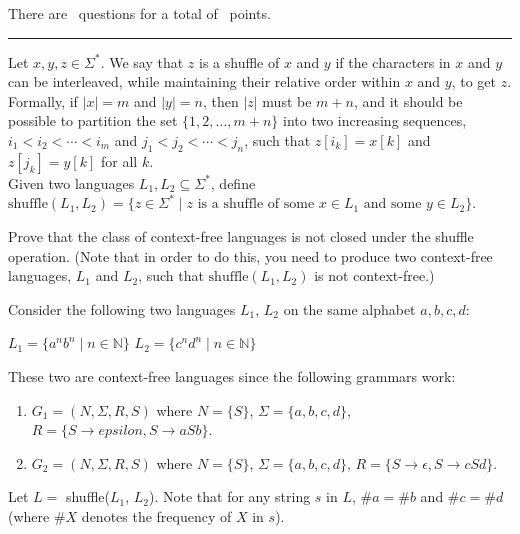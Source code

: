 \documentclass[answers]{exam}
\begin{document}
\vspace{0.1in}

\vspace{0.1in}
There are \numquestions\, questions for a total of \numpoints\, points.
\vspace{0.1in}
\hrule
\vspace{0.2in}
\begin{questions}

Let $x, y, z \in \Sigma^*$. We say that $z$ is a shuffle of $x$ and $y$ if the characters in $x$ and $y$ can be interleaved, while maintaining their relative order within $x$ and $y$, to get $z$.
Formally, if $|x| = m$ and $|y| = n$, then $|z|$ must be $m + n$, and it should be possible to partition the set $\{1, 2, \ldots, m + n\}$ into two increasing sequences, $i_1 < i_2 < \cdots < i_m$ and
$j_1 < j_2 < \cdots < j_n$, such that $z[i_k] = x[k]$ and $z[j_k] = y[k]$ for all $k$.\\

Given two languages $L_1, L_2 \subseteq \Sigma^*$, define $\mathrm{shuffle}(L_1, L_2) = \{z \in \Sigma^* \mid z \text{ is a shuffle of some } x \in L_1 \text{ and some } y \in L_2\}$.

\question[5]

Prove that the class of context-free languages is not closed under the shuffle operation. (Note that in order to do this, you need to produce two context-free languages, $L_1$ and $L_2$, such that
$\text{shuffle}(L_1,L_2)$ is not context-free.)

\begin{solution}

Consider the following two languages $L_1$, $L_2$ on the same alphabet ${a, b, c, d}$:

$L_1 = \{a^nb^n \mid n \in \mathbb{N}\}$
$L_2 = \{c^nd^n \mid n \in \mathbb{N}\}$

These two are context-free languages since the following grammars work:
\begin{enumerate}
    \item $G_1 = (N, \Sigma, R, S)$ where $N = \{S\}$, $\Sigma = \{a, b, c, d\}$, $R = \{S \to epsilon, S \to aSb\}$.
    \item $G_2 = (N, \Sigma, R, S)$ where $N = \{S\}$, $\Sigma = \{a, b, c, d\}$, $R = \{S \to \epsilon, S \to cSd\}$.
\end{enumerate}

Let $L =$ shuffle($L_1$, $L_2$). Note that for any string $s$ in $L$, $\#a = \#b$ and $\#c = \#d$ (where $\#X$ denotes the frequency of $X$ in $s$).


\end{solution}
\end{questions}
\end{document}
